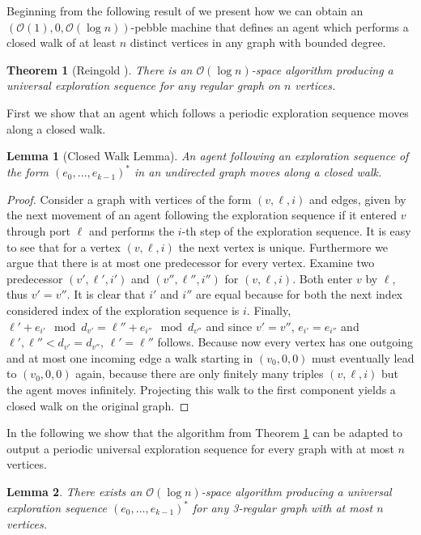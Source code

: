 \documentclass[oneside]{scrartcl}
\newtheorem{thm}{Theorem}
\newtheorem{lem}{Lemma}
\begin{document}
Beginning from the following result of \citeauthor{logspacealg}
\cite{logspacealg} we present how we can obtain an
$(\mathcal{O}(1),0,\mathcal{O}(\log n))$-pebble machine that defines an agent
which performs a closed walk of at least $n$ distinct vertices in any graph
with bounded degree.
\begin{thm}[Reingold \cite{logspacealg}]
  \label{thm:logalg}
  There is an $\mathcal{O}(\log n)$-space algorithm producing a universal
  exploration sequence for any regular graph on $n$ vertices.
\end{thm}
First we show that an agent which follows a periodic exploration sequence
moves along a closed walk.
\begin{lem}[Closed Walk Lemma]
  An agent following an exploration sequence of the form
  $(e_{0},\dots,e_{k-1})^{\ast}$ in an undirected graph moves along a closed
  walk.
\end{lem}
\begin{proof}
  Consider a graph with vertices of the form $(v,\ell,i)$ and
  edges, given by the next movement of an agent following the exploration
  sequence if it entered $v$ through port $\ell$ and performs the $i$-th step
  of the exploration sequence. It is easy to see that for a vertex $(v,\ell,i)$
  the next vertex is unique.
  Furthermore we argue that there is at most one predecessor for every vertex.
  Examine two predecessor $(v',\ell',i')$ and $(v'',\ell'',i'')$ for
  $(v,\ell,i)$. Both enter $v$ by $\ell$, thus $v' = v''$. It is clear that
  $i'$ and $i''$ are equal because for both the next index considered index of
  the exploration sequence is $i$. Finally, $\ell' + e_{i'} \mod d_{v'} =
  \ell'' + e_{i''} \mod d_{v''}$ and since
  $v' = v''$, $e_{i'} = e_{i''}$ and $\ell',\ell'' < d_{v'} = d_{v''}$,
  $\ell' = \ell''$ follows.
  Because now every vertex has one outgoing and at most one incoming edge 
  a walk starting in $(v_{0},0,0)$ must eventually lead to $(v_{0},0,0)$ again,
  because there are only finitely many triples $(v,\ell,i)$ but the agent moves
  infinitely. Projecting this walk to the first component yields a closed walk
  on the original graph.
\end{proof}
In the following we show that the algorithm from Theorem \ref{thm:logalg}
can be adapted to output a periodic universal exploration sequence for every
graph with at most $n$ vertices.
\begin{lem}
  \label{lem:pul}
  There exists an $\mathcal{O}(\log n)$-space algorithm producing a universal
  exploration sequence $(e_{0},\dots,e_{k-1})^{\ast}$ for any 3-regular graph
  with at most $n$ vertices.
\end{lem}
\end{document}
